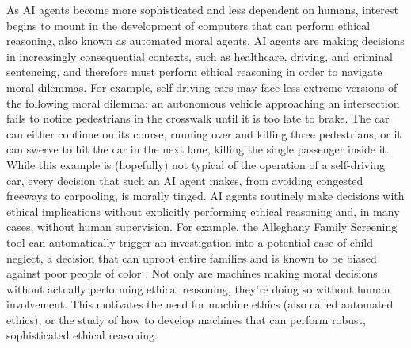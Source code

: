 %
\begin{isabellebody}%
%
%
\isadelimtheory
%
\endisadelimtheory
%
\isatagtheory
%
\endisatagtheory
{\isafoldtheory}%
%
\isadelimtheory
%
\endisadelimtheory
%
\isadelimdocument
%
\endisadelimdocument
%
\isatagdocument
%
\isamarkuptrue%
%
\endisatagdocument
{\isafolddocument}%
%
\isadelimdocument
%
\endisadelimdocument
%
\begin{isamarkuptext}%
As AI agents become more sophisticated and less dependent on humans, interest begins to mount
in the development of computers that can perform ethical reasoning, also known as automated moral agents. 
AI agents are making decisions in increasingly 
consequential contexts, such as healthcare, driving, and criminal sentencing, and therefore 
must perform ethical reasoning in order to navigate moral dilemmas. For example, self-driving
cars may face less extreme versions of the following moral dilemma: an autonomous vehicle approaching 
an intersection fails to notice pedestrians in the crosswalk until it is too late to brake. The car 
can either continue on its course, running over and killing three pedestrians, or it can swerve to 
hit the car in the next lane, killing the single passenger inside it. While this example is (hopefully) 
not typical of the operation of a self-driving car, every decision that such an AI agent makes, from 
avoiding congested freeways to carpooling, is morally tinged. AI agents routinely make decisions with 
ethical implications without explicitly performing ethical
reasoning and, in many cases, without human supervision. For example, the Alleghany Family Screening 
tool can automatically trigger an investigation into a potential case of child neglect, a decision that 
can uproot entire families and is known to be biased against poor people of color \citep{eubanks}. 
Not only are machines making moral decisions without actually performing ethical reasoning, they're 
doing so without human involvement. This motivates the need for machine ethics (also called automated ethics), 
or the study of how to develop machines that can perform robust, sophisticated ethical reasoning. 


\end{isamarkuptext}
\end{isabellebody}

